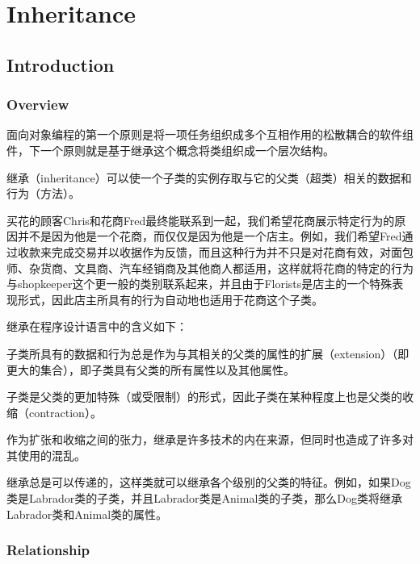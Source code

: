\part{Inheritance}



\chapter{Introduction}



\section{Overview}


面向对象编程的第一个原则是将一项任务组织成多个互相作用的松散耦合的软件组件，下一个原则就是基于继承这个概念将类组织成一个层次结构。


继承（inheritance）可以使一个子类的实例存取与它的父类（超类）相关的数据和行为（方法）。

买花的顾客Chris和花商Fred最终能联系到一起，我们希望花商展示特定行为的原因并不是因为他是一个花商，而仅仅是因为他是一个店主。例如，我们希望Fred通过收款来完成交易并以收据作为反馈，而且这种行为并不只是对花商有效，对面包师、杂货商、文具商、汽车经销商及其他商人都适用，这样就将花商的特定的行为与shopkeeper这个更一般的类别联系起来，并且由于Florists是店主的一个特殊表现形式，因此店主所具有的行为自动地也适用于花商这个子类。

继承在程序设计语言中的含义如下：

\begin{compactitem}
\item 子类所具有的数据和行为总是作为与其相关的父类的属性的扩展（extension）（即更大的集合），即子类具有父类的所有属性以及其他属性。
\item 子类是父类的更加特殊（或受限制）的形式，因此子类在某种程度上也是父类的收缩（contraction）。
\end{compactitem}

作为扩张和收缩之间的张力，继承是许多技术的内在来源，但同时也造成了许多对其使用的混乱。

继承总是可以传递的，这样类就可以继承各个级别的父类的特征。例如，如果Dog类是Labrador类的子类，并且Labrador类是Animal类的子类，那么Dog类将继承Labrador类和Animal类的属性。


\section{Relationship}


